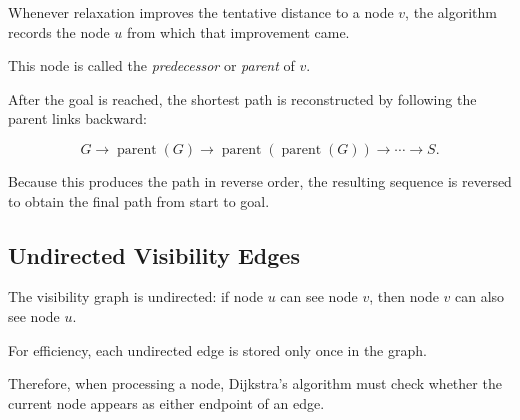 Whenever relaxation improves the tentative distance to a node $v$, the
algorithm records the node $u$ from which that improvement came.

This node is called the \emph{predecessor} or \emph{parent} of $v$.

After the goal is reached, the shortest path is reconstructed by following
the parent links backward:

\[
G \rightarrow \operatorname{parent}(G)
\rightarrow \operatorname{parent}(\operatorname{parent}(G))
\rightarrow \cdots \rightarrow S.
\]

Because this produces the path in reverse order, the resulting sequence is
reversed to obtain the final path from start to goal.

\subsection{Undirected Visibility Edges}

The visibility graph is undirected: if node $u$ can see node $v$, then node
$v$ can also see node $u$.

For efficiency, each undirected edge is stored only once in the graph.

Therefore, when processing a node, Dijkstra's algorithm must check whether
the current node appears as either endpoint of an edge.